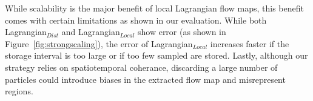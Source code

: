 While scalability is the major benefit of local Lagrangian flow maps, this benefit comes with certain limitations as shown in our evaluation.
%
%
%
%
%
%
%
%
%
While both Lagrangian$_{Dist}$ and Lagrangian$_{Local}$ show error (as shown in Figure~\ref{fig:strongscaling}), the error of Lagrangian$_{Local}$ increases faster if the storage interval is too large or if too few sampled are stored. 
%
{Lastly, although our strategy relies on spatiotemporal coherance, discarding a large number of particles could introduce biases in the extracted flow map and misrepresent regions.}

